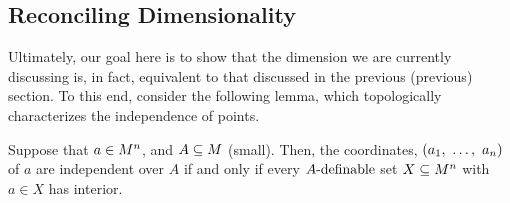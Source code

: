 \subsection{Reconciling Dimensionality}

Ultimately, our goal here is to show that the dimension we are currently discussing is, in fact, equivalent to that discussed in the previous (previous) section. To this end, consider the following lemma, which topologically characterizes the independence of points.

\begin{lemma}
  Suppose that $\aMn[a]{n}$, and $\AM[A]$ (small). Then, the coordinates, $(\vonevm{a}{n})$ of $a$ are independent over $A$ if and only if every $\Adefnb$ set $\XMn[X]{n}$ with $a \in X$ has \inhb interior.
  \label{lemma:indep_top}
\end{lemma}

